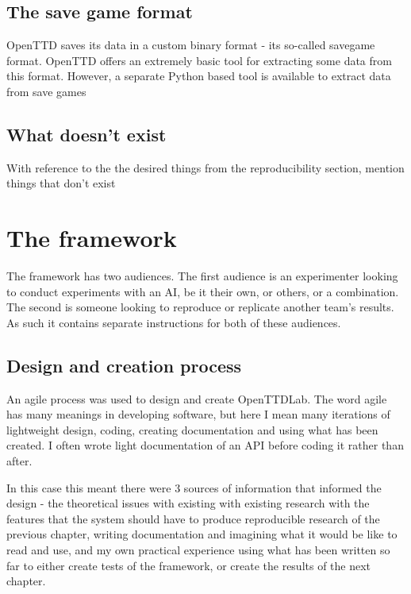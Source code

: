 \documentclass[logo,msc]{infthesis}           %
\begin{document}
\section{The save game format}

OpenTTD saves its data in a custom binary format - its so-called savegame format. OpenTTD offers an extremely basic tool for extracting some data from this format. However, a separate Python based tool is available to extract data from save games

\section{What doesn't exist}

\begin{itemize}
\begin{item}
With reference to the the desired things from the reproducibility section, mention things that don't exist
\end{item}
\end{itemize}

\chapter{The framework}

The framework has two audiences. The first audience is an experimenter looking to conduct experiments with an AI, be it their own, or others, or a combination. The second is someone looking to reproduce or replicate another team's results. As such it contains separate instructions for both of these audiences.


\section{Design and creation process}

An agile process was used to design and create OpenTTDLab. The word agile has many meanings in developing software, but here I mean many iterations of lightweight design, coding, creating documentation and using what has been created. I often wrote light documentation of an API before coding it rather than after.

In this case this meant there were 3 sources of information that informed the design - the theoretical issues with existing with existing research with the features that the system should have to produce reproducible research of the previous chapter, writing documentation and imagining what it would be like to read and use, and my own practical experience using what has been written so far to either create tests of the framework, or create the results of the next chapter.
\end{document}
